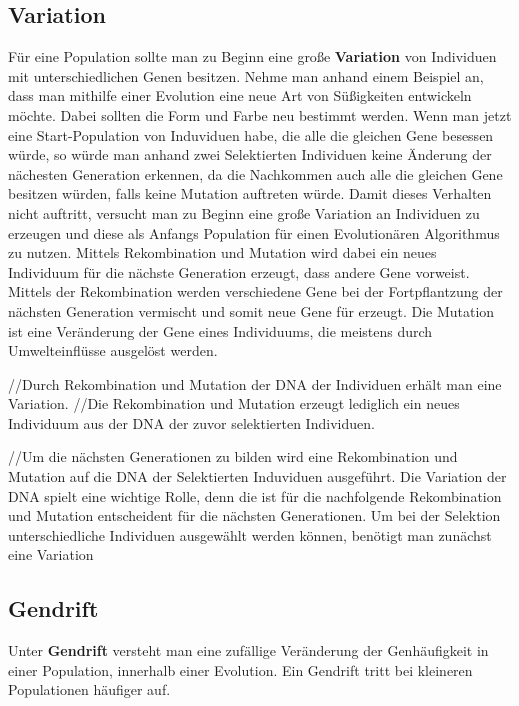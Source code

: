 \subsection{Variation}

F{\"u}r eine Population sollte man zu Beginn eine gro{\ss}e \textbf{Variation} von Individuen mit unterschiedlichen Genen besitzen. 
Nehme man anhand einem Beispiel an, dass man mithilfe einer Evolution eine neue Art von S{\"u}{\ss}igkeiten entwickeln m{\"o}chte. Dabei sollten die Form und Farbe neu bestimmt werden. Wenn man jetzt eine Start-Population von Induviduen habe, die alle die gleichen Gene besessen w{\"u}rde, so w{\"u}rde man anhand zwei Selektierten Individuen keine {\"A}nderung der n{\"a}chesten Generation erkennen, da die Nachkommen auch alle die gleichen Gene besitzen w{\"u}rden, falls keine Mutation auftreten w{\"u}rde.
Damit dieses Verhalten nicht auftritt, versucht man zu Beginn eine gro{\ss}e Variation an Individuen zu erzeugen und diese als Anfangs Population f{\"u}r einen Evolution{\"a}ren Algorithmus zu nutzen. Mittels Rekombination und Mutation wird dabei ein neues Individuum f{\"u}r die n{\"a}chste Generation erzeugt, dass andere Gene vorweist. Mittels der Rekombination werden verschiedene Gene bei der Fortpflantzung der n{\"a}chsten Generation vermischt und somit neue Gene f{\"u}r erzeugt. Die Mutation ist eine Ver{\"a}nderung der Gene eines Individuums, die meistens durch Umwelteinfl{\"u}sse ausgel{\"o}st werden. \cite{flickevolutionare} 

//Durch Rekombination und Mutation der DNA der Individuen erh{\"a}lt man eine Variation. 
//Die Rekombination und Mutation erzeugt lediglich ein neues Individuum aus der DNA der zuvor selektierten Individuen.

//Um die n{\"a}chsten Generationen zu bilden wird eine Rekombination und Mutation auf die DNA der Selektierten Induviduen ausgef{\"u}hrt. 
Die Variation der DNA  spielt eine wichtige Rolle, denn die ist f{\"u}r die nachfolgende Rekombination und Mutation entscheident f{\"u}r die n{\"a}chsten Generationen. 
Um bei der Selektion unterschiedliche Individuen ausgew{\"a}hlt werden k{\"o}nnen, ben{\"o}tigt man zun{\"a}chst eine Variation 

\subsection{Gendrift}
Unter \textbf{Gendrift} versteht man eine zuf{\"a}llige Ver{\"a}nderung der Genh{\"a}ufigkeit in einer Population, innerhalb einer Evolution. Ein Gendrift tritt bei kleineren Populationen h{\"a}ufiger auf. \cite{gendrift2018brockhaus}


